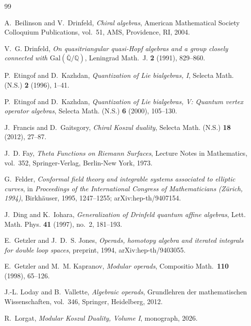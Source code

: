 \documentclass[11pt,reqno]{amsart}
\theoremstyle{definition}
\theoremstyle{remark}
\numberwithin{equation}{section}
\begin{document}
\begin{thebibliography}{99}

A.~Beilinson and V.~Drinfeld,
\emph{Chiral algebras},
American Mathematical Society Colloquium Publications, vol.~51,
AMS, Providence, RI, 2004.

V.~G. Drinfeld,
\emph{On quasitriangular quasi-Hopf algebras and a group closely
connected with $\mathrm{Gal}(\overline{\mathbb{Q}}/\mathbb{Q})$},
Leningrad Math.~J. \textbf{2} (1991), 829--860.

P.~Etingof and D.~Kazhdan,
\emph{Quantization of Lie bialgebras, I},
Selecta Math. (N.S.) \textbf{2} (1996), 1--41.

P.~Etingof and D.~Kazhdan,
\emph{Quantization of Lie bialgebras, V: Quantum vertex operator
algebras},
Selecta Math. (N.S.) \textbf{6} (2000), 105--130.

J.~Francis and D.~Gaitsgory,
\emph{Chiral Koszul duality},
Selecta Math. (N.S.) \textbf{18} (2012), 27--87.

J.~D. Fay,
\emph{Theta Functions on Riemann Surfaces},
Lecture Notes in Mathematics, vol.~352, Springer-Verlag,
Berlin-New York, 1973.

G.~Felder,
\emph{Conformal field theory and integrable systems associated to
elliptic curves},
in \emph{Proceedings of the International Congress of
Mathematicians (Z\"urich, 1994)}, Birkh\"auser, 1995,
1247--1255; arXiv:hep-th/9407154.

J.~Ding and K.~Iohara,
\emph{Generalization of Drinfeld quantum affine algebras},
Lett. Math. Phys. \textbf{41} (1997), no.~2, 181--193.

E.~Getzler and J.~D.~S. Jones,
\emph{Operads, homotopy algebra and iterated integrals for
double loop spaces},
preprint, 1994, arXiv:hep-th/9403055.

E.~Getzler and M.~M. Kapranov,
\emph{Modular operads},
Compositio Math.\ \textbf{110} (1998), 65--126.

J.-L. Loday and B.~Vallette,
\emph{Algebraic operads},
Grundlehren der mathematischen Wissenschaften, vol.~346,
Springer, Heidelberg, 2012.

R.~Lorgat,
\emph{Modular Koszul Duality, Volume I},
monograph, 2026.


\end{thebibliography}
\end{document}

